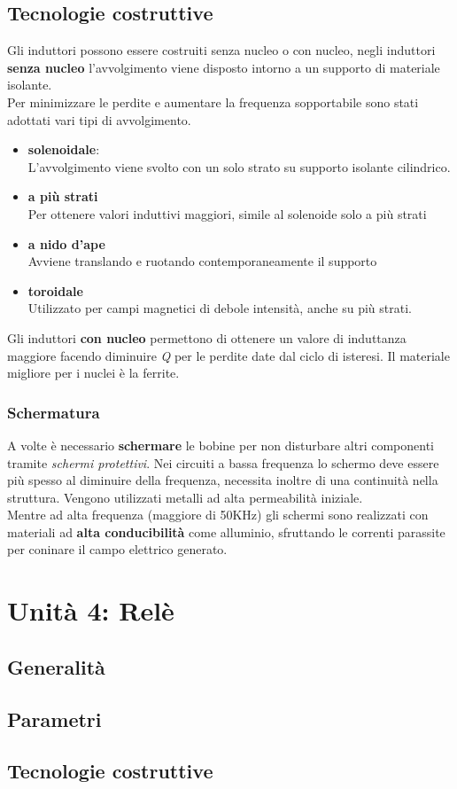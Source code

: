 \documentclass{article}
\begin{document}
\subsection{Tecnologie costruttive}
Gli induttori possono essere costruiti senza nucleo o con nucleo,
negli induttori \textbf{senza nucleo} l'avvolgimento viene disposto intorno a un supporto di materiale isolante.\\
Per minimizzare le perdite e aumentare la frequenza sopportabile sono stati adottati vari tipi di avvolgimento.
\begin{itemize}
    \item \textbf{solenoidale}:\\
    L'avvolgimento viene svolto con un solo strato su supporto isolante cilindrico.
    \item \textbf{a più strati} \\
    Per ottenere valori induttivi maggiori, simile al solenoide solo a più strati
    \item \textbf{a nido d'ape} \\
    Avviene translando e ruotando contemporaneamente il supporto 
    \item \textbf{toroidale}\\
    Utilizzato per campi magnetici di debole intensità, anche su più strati.
\end{itemize}
Gli induttori \textbf{con nucleo} permettono di ottenere un valore di induttanza maggiore facendo diminuire \emph{Q} per le perdite date dal ciclo di isteresi.
Il materiale migliore per i nuclei è la ferrite.
\subsubsection{Schermatura}
A volte è necessario \textbf{schermare} le bobine per non disturbare altri componenti tramite \textit{schermi protettivi}.
Nei circuiti a bassa frequenza lo schermo deve essere più spesso al diminuire della frequenza, necessita inoltre di una continuità nella struttura. Vengono utilizzati metalli ad alta permeabilità iniziale.\\
Mentre ad alta frequenza (maggiore di 50KHz) gli schermi sono realizzati con materiali ad \textbf{alta conducibilità} come alluminio, sfruttando le correnti parassite per coninare il campo elettrico generato.
\section{Unità 4: Relè}
\subsection{Generalità}
\subsection{Parametri}
\subsection{Tecnologie costruttive}
\end{document}
